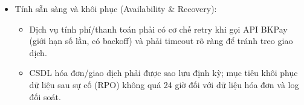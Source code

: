 \begin{itemize}
    \item Tính sẵn sàng và khôi phục (Availability \& Recovery):
    \begin{itemize}
        \item Dịch vụ tính phí/thanh toán phải có cơ chế retry khi gọi API BKPay (giới hạn số lần, có backoff) và phải timeout rõ ràng để tránh treo giao dịch.
        \item CSDL hóa đơn/giao dịch phải được sao lưu định kỳ; mục tiêu khôi phục dữ liệu sau sự cố (RPO) không quá 24 giờ đối với dữ liệu hóa đơn và log đối soát.
    \end{itemize}
\end{itemize}